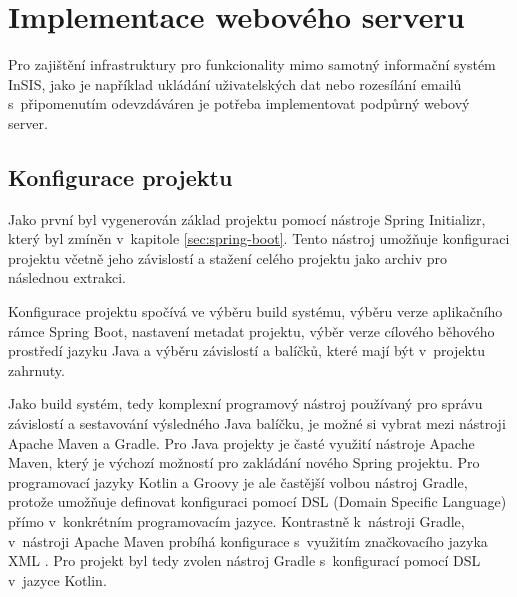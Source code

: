 \chapter{Implementace webového serveru}

Pro zajištění infrastruktury pro funkcionality mimo samotný informační systém InSIS, jako je například ukládání uživatelských dat nebo rozesílání emailů s~připomenutím odevzdáváren je potřeba implementovat podpůrný webový server. 

\section{Konfigurace projektu}

Jako první byl vygenerován základ projektu pomocí nástroje Spring Initializr, který byl zmíněn v~kapitole \ref{sec:spring-boot}. Tento nástroj umožňuje konfiguraci projektu včetně jeho závislostí a stažení celého projektu jako archiv pro následnou extrakci.

Konfigurace projektu spočívá ve výběru build systému, výběru verze aplikačního rámce Spring Boot, nastavení metadat projektu, výběr verze cílového běhového prostředí jazyku Java a výběru závislostí a balíčků, které mají být v~projektu zahrnuty.

Jako build systém, tedy komplexní programový nástroj používaný pro správu závislostí a sestavování výsledného Java balíčku, je možné si vybrat mezi nástroji Apache Maven a Gradle. Pro Java projekty je časté využití nástroje Apache Maven, který je výchozí možností pro zakládání nového Spring projektu. Pro programovací jazyky Kotlin a Groovy je ale častější volbou nástroj Gradle, protože umožňuje definovat konfiguraci pomocí DSL (Domain Specific Language) přímo v~konkrétním programovacím jazyce. Kontrastně k~nástroji Gradle, v~nástroji Apache Maven probíhá konfigurace s~využitím značkovacího jazyka XML \cite{pom_reference}. Pro projekt byl tedy zvolen nástroj Gradle s~konfigurací pomocí DSL v~jazyce Kotlin.

